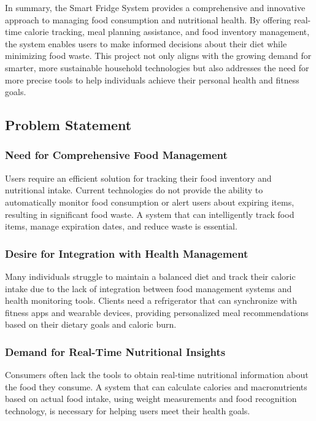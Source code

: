 \documentclass[conference]{IEEEtran}
\begin{document}
In summary, the Smart Fridge System provides a comprehensive and innovative approach to managing food consumption and nutritional health. By offering real-time calorie tracking, meal planning assistance, and food inventory management, the system enables users to make informed decisions about their diet while minimizing food waste. This project not only aligns with the growing demand for smarter, more sustainable household technologies but also addresses the need for more precise tools to help individuals achieve their personal health and fitness goals.
\subsection{Problem Statement}

\subsubsection{Need for Comprehensive Food Management}
Users require an efficient solution for tracking their food inventory and nutritional intake. Current technologies do not provide the ability to automatically monitor food consumption or alert users about expiring items, resulting in significant food waste. A system that can intelligently track food items, manage expiration dates, and reduce waste is essential.\\

\subsubsection{Desire for Integration with Health Management}
Many individuals struggle to maintain a balanced diet and track their caloric intake due to the lack of integration between food management systems and health monitoring tools. Clients need a refrigerator that can synchronize with fitness apps and wearable devices, providing personalized meal recommendations based on their dietary goals and caloric burn.\\

\subsubsection{Demand for Real-Time Nutritional Insights}
Consumers often lack the tools to obtain real-time nutritional information about the food they consume. A system that can calculate calories and macronutrients based on actual food intake, using weight measurements and food recognition technology, is necessary for helping users meet their health goals.\\
\end{document}
